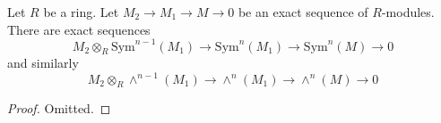 \begin{lemma}
\label{lemma-presentation-sym-exterior}
Let $R$ be a ring.
Let $M_2 \to M_1 \to M \to 0$ be an exact sequence of $R$-modules.
There are exact sequences
$$
M_2 \otimes_R \text{Sym}^{n - 1}(M_1)
\to
\text{Sym}^n(M_1)
\to
\text{Sym}^n(M)
\to
0
$$
and similarly
$$
M_2 \otimes_R \wedge^{n - 1}(M_1)
\to
\wedge^n(M_1)
\to
\wedge^n(M)
\to
0
$$
\end{lemma}

\begin{proof}
Omitted.
\end{proof}